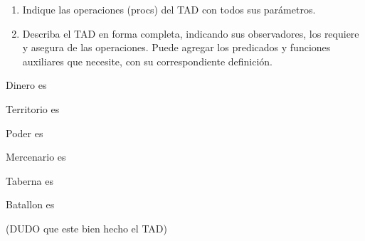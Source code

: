 \begin{enumerate}[label=\alph*)]
	\item Indique las operaciones (procs) del TAD con todos sus parámetros.
	\item Describa el TAD en forma completa, indicando sus observadores, los requiere y asegura de las operaciones. Puede agregar los predicados y funciones auxiliares que necesite, con su correspondiente definición.
\end{enumerate}

Dinero es \float

Territorio es \str

Poder es \ent

Mercenario es 

Taberna es 

Batallon es \conj{\str}
\bigskip

(DUDO que este bien hecho el TAD)

\pagebreak

